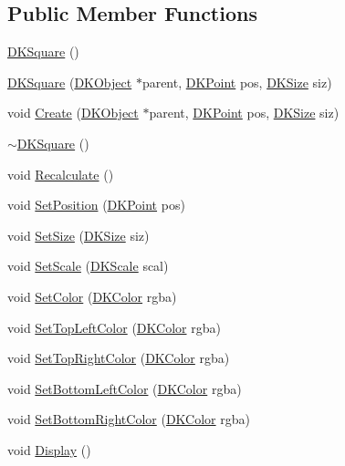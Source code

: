 \subsection*{Public Member Functions}
\begin{DoxyCompactItemize}
\item 
\hyperlink{class_d_k_square_ad727707011cc508f42ee69652f40be83}{D\-K\-Square} ()
\item 
\hyperlink{class_d_k_square_adc0b58dd61e41302b43ff9cbe43376c7}{D\-K\-Square} (\hyperlink{class_d_k_object}{D\-K\-Object} $\ast$parent, \hyperlink{_d_k_axis_8h_a0ca1f005fbb936f8e7a7f2433591f418}{D\-K\-Point} pos, \hyperlink{_d_k_axis_8h_aaa25a8c7cbf504fffdb8a4208ff7a731}{D\-K\-Size} siz)
\item 
void \hyperlink{class_d_k_square_a2df8361e45a59533cb4c782ed0ea1133}{Create} (\hyperlink{class_d_k_object}{D\-K\-Object} $\ast$parent, \hyperlink{_d_k_axis_8h_a0ca1f005fbb936f8e7a7f2433591f418}{D\-K\-Point} pos, \hyperlink{_d_k_axis_8h_aaa25a8c7cbf504fffdb8a4208ff7a731}{D\-K\-Size} siz)
\item 
\hyperlink{class_d_k_square_abd817b09804f82feb859901ddcf8d79b}{$\sim$\-D\-K\-Square} ()
\item 
void \hyperlink{class_d_k_square_aafdcb5d6c36bf48b62fa49b705489234}{Recalculate} ()
\item 
void \hyperlink{class_d_k_square_a9d06aaa5526db7f97ff0964ba585ae08}{Set\-Position} (\hyperlink{_d_k_axis_8h_a0ca1f005fbb936f8e7a7f2433591f418}{D\-K\-Point} pos)
\item 
void \hyperlink{class_d_k_square_a2dba38485f2d5649fff78be2311b36c6}{Set\-Size} (\hyperlink{_d_k_axis_8h_aaa25a8c7cbf504fffdb8a4208ff7a731}{D\-K\-Size} siz)
\item 
void \hyperlink{class_d_k_square_a49af22964d479035769a13658c636cec}{Set\-Scale} (\hyperlink{_d_k_axis_8h_ab9e555d97d32f68d4c77474d1e1ba787}{D\-K\-Scale} scal)
\item 
void \hyperlink{class_d_k_square_a56271c74ada914ff86212585b5c6b64e}{Set\-Color} (\hyperlink{class_d_k_color}{D\-K\-Color} rgba)
\item 
void \hyperlink{class_d_k_square_ab9d534940e398a9c5b9d31bda8ef846c}{Set\-Top\-Left\-Color} (\hyperlink{class_d_k_color}{D\-K\-Color} rgba)
\item 
void \hyperlink{class_d_k_square_a4b4d9cb9fe903d1bde3d9644b09502e7}{Set\-Top\-Right\-Color} (\hyperlink{class_d_k_color}{D\-K\-Color} rgba)
\item 
void \hyperlink{class_d_k_square_a24e2a9fcb955639bd1157395bb3353dc}{Set\-Bottom\-Left\-Color} (\hyperlink{class_d_k_color}{D\-K\-Color} rgba)
\item 
void \hyperlink{class_d_k_square_a14903360281e4b0fb0ce4c31aa461918}{Set\-Bottom\-Right\-Color} (\hyperlink{class_d_k_color}{D\-K\-Color} rgba)
\item 
void \hyperlink{class_d_k_square_af428131470e2cff55a1b609e479dd6b8}{Display} ()
\end{DoxyCompactItemize}

